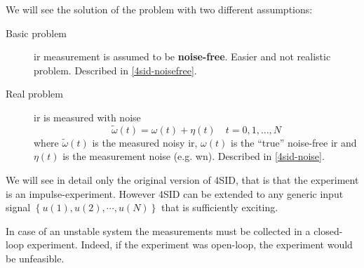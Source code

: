 We will see the solution of the problem with two different assumptions:
\begin{description}
    \item [Basic problem] \gls{ir} measurement is assumed to be \textbf{noise-free}. Easier and not realistic problem. Described in \ref{4sid-noisefree}.
    \item [Real problem] \gls{ir} is measured with noise
    \[ \widetilde{\omega}(t) = \omega(t) + \eta(t) \quad t = 0, 1,\dots, N \] where
        $\widetilde{\omega}(t)$ is the measured noisy \gls{ir},
        $\omega(t)$ is the ``true'' noise-free \gls{ir} and
        $\eta(t)$ is the measurement noise (e.g. \gls{wn}). Described in \ref{4sid-noise}.
\end{description}
\begin{remark}
    We will see in detail only the original version of 4SID, that is that the experiment is an impulse-experiment.
    However 4SID can be extended to any generic input signal $\left\{ u(1), u(2), \cdots, u(N) \right\}$ that is sufficiently exciting.
\end{remark}
\begin{remark}
    In case of an unstable system the measurements must be collected in a closed-loop experiment.
    Indeed, if the experiment was open-loop, the experiment would be unfeasible.

    \begin{figure}[H]
        \centering
    \end{figure}
\end{remark}

